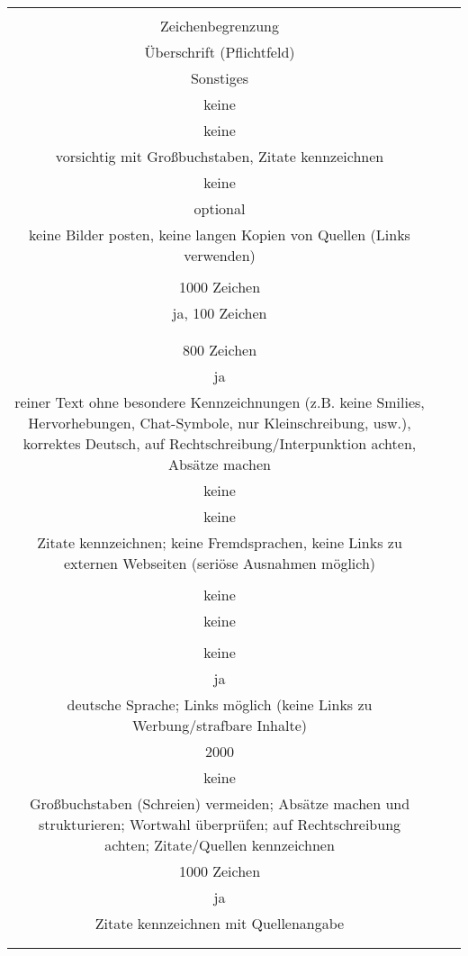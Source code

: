 \begin{landscape}
\begin{tabular}{ccc}
{Kommentar: formale Regeln\\
Zeichenbegrenzung\\
Überschrift (Pflichtfeld)\\
Sonstiges 
&		%
		\\
		keine\\
		keine\\
		vorsichtig mit Großbuchstaben, Zitate kennzeichnen	
		&
		\\
		keine\\
		optional\\
		keine Bilder posten, keine langen Kopien von Quellen (Links verwenden)\\
		&
		\\
		1000 Zeichen\\
		ja, 100 Zeichen\\
		\\
		&
		\\
		800 Zeichen\\
		ja\\
		reiner Text ohne besondere Kennzeichnungen (z.B. keine Smilies, Hervorhebungen, Chat-Symbole, nur Kleinschreibung, usw.), korrektes Deutsch, auf Rechtschreibung/Interpunktion achten, Absätze machen
		&
		\\
		keine\\
		keine\\
		Zitate kennzeichnen; keine Fremdsprachen, keine Links zu externen Webseiten (seriöse Ausnahmen möglich)\\
		&
		\\
		keine\\
		keine\\
		&
		\\
		keine\\
		ja\\
		deutsche Sprache; Links möglich (keine Links zu Werbung/strafbare Inhalte)
		&
		\\
		2000\\
		keine\\
		Großbuchstaben (Schreien) vermeiden; Absätze machen und strukturieren; Wortwahl überprüfen; auf Rechtschreibung achten; 				Zitate/Quellen kennzeichnen
		&
		\\
		1000 Zeichen\\
		ja\\
		Zitate kennzeichnen mit Quellenangabe\\
		&
		\\
}
\end{tabular}
\end{landscape}
